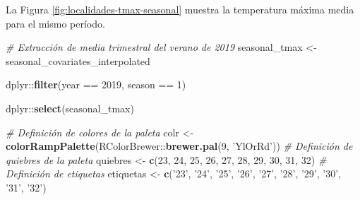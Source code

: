 \documentclass[
  12pt]{article}
\newenvironment{Shaded}{}{}
\newcommand{\CommentTok}[1]{\textcolor[rgb]{0.38,0.63,0.69}{\textit{#1}}}
\newcommand{\DecValTok}[1]{\textcolor[rgb]{0.25,0.63,0.44}{#1}}
\newcommand{\KeywordTok}[1]{\textcolor[rgb]{0.00,0.44,0.13}{\textbf{#1}}}
\newcommand{\NormalTok}[1]{#1}
\newcommand{\OperatorTok}[1]{\textcolor[rgb]{0.40,0.40,0.40}{#1}}
\newcommand{\StringTok}[1]{\textcolor[rgb]{0.25,0.44,0.63}{#1}}
\begin{document}
La Figura \ref{fig:localidades-tmax-seasonal} muestra la temperatura máxima media para el mismo período.

\begin{Shaded}
\begin{Highlighting}[]
\CommentTok{# Extracción de media trimestral del verano de 2019}
\NormalTok{seasonal_tmax <-}\StringTok{ }\NormalTok{seasonal_covariates_interpolated }\OperatorTok{%
\StringTok{  }\NormalTok{dplyr}\OperatorTok{::}\KeywordTok{filter}\NormalTok{(year }\OperatorTok{==}\StringTok{ }\DecValTok{2019}\NormalTok{, season }\OperatorTok{==}\StringTok{ }\DecValTok{1}\NormalTok{) }\OperatorTok{%
\StringTok{  }\NormalTok{dplyr}\OperatorTok{::}\KeywordTok{select}\NormalTok{(seasonal_tmax)}

\CommentTok{# Definición de colores de la paleta}
\NormalTok{colr <-}\StringTok{ }\KeywordTok{colorRampPalette}\NormalTok{(RColorBrewer}\OperatorTok{::}\KeywordTok{brewer.pal}\NormalTok{(}\DecValTok{9}\NormalTok{, }\StringTok{'YlOrRd'}\NormalTok{))}
\CommentTok{# Definición de quiebres de la paleta}
\NormalTok{quiebres <-}\StringTok{ }\KeywordTok{c}\NormalTok{(}\DecValTok{23}\NormalTok{, }\DecValTok{24}\NormalTok{, }\DecValTok{25}\NormalTok{, }\DecValTok{26}\NormalTok{, }\DecValTok{27}\NormalTok{, }\DecValTok{28}\NormalTok{, }\DecValTok{29}\NormalTok{, }\DecValTok{30}\NormalTok{, }\DecValTok{31}\NormalTok{, }\DecValTok{32}\NormalTok{)}
\CommentTok{# Definición de etiquetas}
\NormalTok{etiquetas <-}\StringTok{ }\KeywordTok{c}\NormalTok{(}\StringTok{'23'}\NormalTok{, }\StringTok{'24'}\NormalTok{, }\StringTok{'25'}\NormalTok{, }\StringTok{'26'}\NormalTok{, }\StringTok{'27'}\NormalTok{, }\StringTok{'28'}\NormalTok{, }\StringTok{'29'}\NormalTok{, }\StringTok{'30'}\NormalTok{, }\StringTok{'31'}\NormalTok{, }\StringTok{'32'}\NormalTok{)}

}}
\end{Highlighting}
\end{Shaded}
\end{document}
